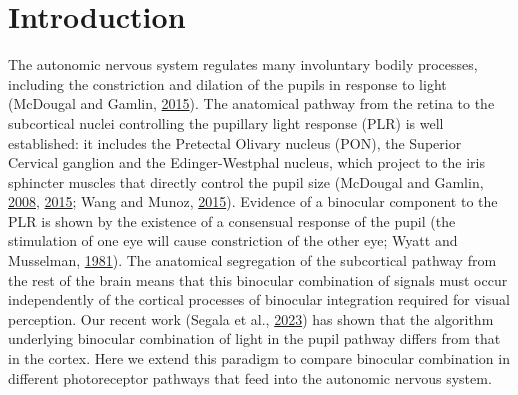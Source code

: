 \documentclass[
]{article}
\begin{document}
\hypertarget{introduction}{%
\section{Introduction}\label{introduction}}

The autonomic nervous system regulates many involuntary bodily processes, including the constriction and dilation of the pupils in response to light (McDougal and Gamlin, \protect\hyperlink{ref-McDougal2015}{2015}). The anatomical pathway from the retina to the subcortical nuclei controlling the pupillary light response (PLR) is well established: it includes the Pretectal Olivary nucleus (PON), the Superior Cervical ganglion and the Edinger-Westphal nucleus, which project to the iris sphincter muscles that directly control the pupil size (McDougal and Gamlin, \protect\hyperlink{ref-McDougal2008}{2008}, \protect\hyperlink{ref-McDougal2015}{2015}; Wang and Munoz, \protect\hyperlink{ref-Wang2015}{2015}). Evidence of a binocular component to the PLR is shown by the existence of a consensual response of the pupil (the stimulation of one eye will cause constriction of the other eye; Wyatt and Musselman, \protect\hyperlink{ref-Wyatt1981}{1981}). The anatomical segregation of the subcortical pathway from the rest of the brain means that this binocular combination of signals must occur independently of the cortical processes of binocular integration required for visual perception. Our recent work (Segala et al., \protect\hyperlink{ref-Segala2023}{2023}) has shown that the algorithm underlying binocular combination of light in the pupil pathway differs from that in the cortex. Here we extend this paradigm to compare binocular combination in different photoreceptor pathways that feed into the autonomic nervous system.
\end{document}
